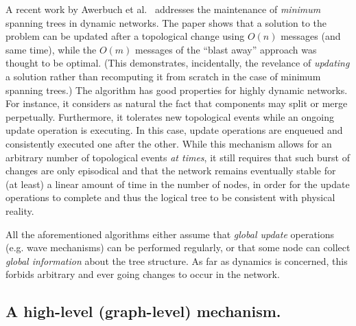 \documentclass[twocolumn]{article}
\begin{document}
A recent work by Awerbuch et al.~\cite{Awerbuch08} addresses the maintenance of {\em minimum} spanning trees in dynamic networks. The paper shows that a solution to the problem can be updated after a topological change using $O(n)$ messages (and same time), while the $O(m)$ messages of the ``blast away'' approach was thought to be optimal. (This demonstrates, incidentally, the revelance of {\em updating} a solution rather than recomputing it from scratch in the case of minimum spanning trees.) The algorithm has good properties for highly dynamic networks. For instance, it considers as natural the fact that components may split or merge perpetually. Furthermore, it tolerates new topological events while an ongoing update operation is executing. In this case, update operations are enqueued and consistently executed one after the other. While this mechanism allows for an arbitrary number of topological events {\em at times}, it still requires that such burst of changes are only episodical and that the network remains eventually stable for (at least) a linear amount of time in the number of nodes, in order for the update operations to complete and thus the logical tree to be consistent with physical reality.

All the aforementioned algorithms either assume that {\em global update} operations (e.g. wave mechanisms) can be performed regularly, or that some node can collect {\em global information} about the tree structure. As far as dynamics is concerned, this forbids arbitrary and ever going changes to occur in the network. 
 



\subsection{A high-level (graph-level) mechanism.}
\label{sec:principle}
\end{document}
